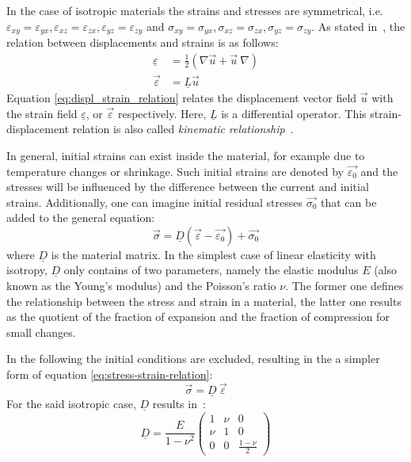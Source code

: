  In the case of isotropic materials the strains and stresses are symmetrical, i.e. $\varepsilon_{xy} = \varepsilon_{yx}, \varepsilon_{xz} = \varepsilon_{zx}, \varepsilon_{yz} = \varepsilon_{zy}$ and $\sigma_{xy} = \sigma_{yx}, \sigma_{xz} = \sigma_{zx}, \sigma_{yz} = \sigma_{zy}$. As stated in~\cite{steinke2005finite}, the relation between displacements and strains is as follows:
 \begin{align}\label{eq:displ_strain_relation}
 \underline{\varepsilon} &= \frac{1}{2}\left(\nabla\vec{u} + \vec{u}\:\nabla \right) \\
 \vec{\varepsilon} &= \underline{L}\vec{u} \nonumber
 \end{align}
 Equation \eqref{eq:displ_strain_relation} relates the displacement vector field $\vec{u}$ with the strain field $\underline{\varepsilon}$, or $\vec{\varepsilon}$ respectively. Here, $\underline{L}$ is a differential operator. This strain-displacement relation is also called \textit{kinematic relationship}~\cite{steinke2005finite}.
 
 In general, initial strains can exist inside the material, for example due to temperature changes or shrinkage. Such initial strains are denoted by $\vec{\varepsilon_0}$ and the stresses will be influenced by the difference between the current and initial strains. Additionally, one can imagine initial residual stresses $\vec{\sigma_0}$ that can be added to the general equation:
 \begin{equation}\label{eq:stress-strain-relation}
 \vec{\sigma} = \underline{D}\left(\vec{\varepsilon}-\vec{\varepsilon_0}\right)+\vec{\sigma_0}
 \end{equation}
 where $\underline{D}$ is the material matrix. In the simplest case of linear elasticity with isotropy, $\underline{D}$ only contains of two parameters, namely the elastic modulus $E$ (also known as the Young's modulus) and the Poisson's ratio $\nu$. The former one defines the relationship between the stress and strain in a material, the latter one results as the quotient of the fraction of expansion and the fraction of compression for small changes.
 
 In the following the initial conditions are excluded, resulting in the a simpler form of equation \eqref{eq:stress-strain-relation}:
 \begin{equation}
 \vec{\sigma} = \underline{D}\ \vec{\varepsilon}
 \end{equation}
 For the said isotropic case, $\underline{D}$ results in~\cite{zienkiewicz2000finite}:
 \begin{equation}
 \underline{D} = \frac{E}{1-\nu^2}\begin{pmatrix}
 1 & \nu & 0 \\
 \nu & 1 & 0 \\
 0 & 0 & \frac{1-\nu}{2}
 \end{pmatrix}
 \end{equation}
 
